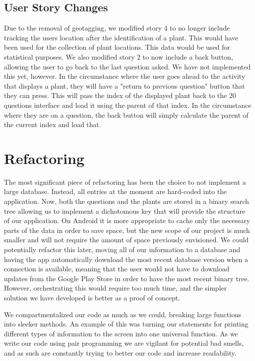 \documentclass[a4paper]{article}
\begin{document}
\subsection{User Story Changes}
Due to the removal of geotagging, we modified story 4 to no longer include tracking the users location after the identification of a plant. This would have been used for the collection of plant locations. This data would be used for statistical purposes. We also modified story 2 to now include a back button, allowing the user to go back to the last question asked. We have not implemented this yet, however. In the circumstance where the user goes ahead to the activity that displays a plant, they will have a "return to previous question" button that they can press. This will pass the index of the displayed plant back to the 20 questions interface and load it using the parent of that index. In the circumstance where they are on a question, the back button will simply calculate the parent of the current index and load that. 
\pagebreak
\section{Refactoring} The most significant piece of refactoring has been the choice to not implement a large database. Instead, all entries at the moment are hard-coded into the application. Now, both the questions and the plants are stored in a binary search tree allowing us to implement a dichotomous key that will provide the structure of our application. On Android it is more appropriate to cache only the necessary parts of the data in order to save space, but the new scope of our project is much smaller and will not require the amount of space previously envisioned. We could potentially refactor this later, moving all of our information to a database and having the app automatically download the most recent database version when a connection is available, meaning that the user would not have to download updates from the Google Play Store in order to have the most recent binary tree. However, orchestrating this would require too much time, and the simpler solution we have developed is better as a proof of concept. 

We compartmentalized our code as much as we could, breaking large functions into sleeker methods. An example of this was turning our statements for printing different types of information to the screen into one universal function. As we write our code using pair programming we are vigilant for potential bad smells, and as such are constantly trying to better our code and increase readability. 
\end{document}
